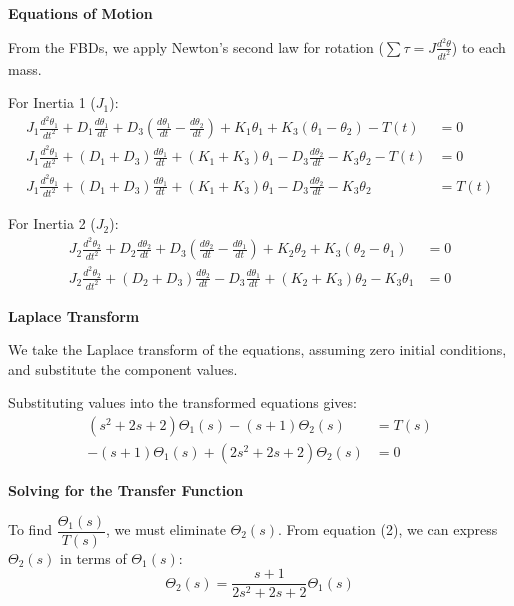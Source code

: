 \documentclass[11pt]{article}
\begin{document}
\noindent\textbf{Equations of Motion}
\vspace{5pt}

\noindent From the FBDs, we apply Newton's second law for rotation ($\sum \tau = J \frac{d^2\theta}{dt^2}$) to each mass.

\vspace{12pt}
{For Inertia 1 ($J_1$):}
\begin{align*}
J_1\frac{d^2\theta_1}{dt^2}
+ D_1\frac{d\theta_1}{dt}
+ D_3\!\left(\frac{d\theta_1}{dt}-\frac{d\theta_2}{dt}\right)
+ K_1\theta_1
+ K_3\!\left(\theta_1-\theta_2\right)
- T(t) &= 0 \\[4pt]
J_1\frac{d^2\theta_1}{dt^2}
+ (D_1 + D_3)\frac{d\theta_1}{dt}
+ (K_1 + K_3)\theta_1
- D_3\frac{d\theta_2}{dt}
- K_3\theta_2
- T(t) &= 0 \\[4pt]
J_1\frac{d^2\theta_1}{dt^2}
+ (D_1 + D_3)\frac{d\theta_1}{dt}
+ (K_1 + K_3)\theta_1
- D_3\frac{d\theta_2}{dt}
- K_3\theta_2
&= T(t)
\end{align*}

\newpage
{For Inertia 2 ($J_2$):}
\begin{align*}
J_2\frac{d^2\theta_2}{dt^2}
+ D_2\frac{d\theta_2}{dt}
+ D_3\!\left(\frac{d\theta_2}{dt}-\frac{d\theta_1}{dt}\right)
+ K_2\theta_2
+ K_3\!\left(\theta_2-\theta_1\right) &= 0 \\[4pt]
J_2\frac{d^2\theta_2}{dt^2}
+ (D_2 + D_3)\frac{d\theta_2}{dt}
- D_3\frac{d\theta_1}{dt}
+ (K_2 + K_3)\theta_2
- K_3\theta_1 &= 0
\end{align*}

\noindent\textbf{Laplace Transform}
\vspace{5pt}

\noindent We take the Laplace transform of the equations, assuming zero initial conditions, and substitute the component values.
\vspace{12pt}

{Substituting values into the transformed equations gives:}
\begin{align}
    (s^2 + 2s + 2)\Theta_1(s) - (s + 1)\Theta_2(s) &= T(s) \tag{1} \\
    -(s + 1)\Theta_1(s) + (2s^2 + 2s + 2)\Theta_2(s) &= 0 \tag{2}
\end{align}

\noindent\textbf{Solving for the Transfer Function}
\vspace{12pt}

\noindent To find $\dfrac{\Theta_1(s)}{T(s)}$, we must eliminate $\Theta_2(s)$. From equation (2), we can express $\Theta_2(s)$ in terms of $\Theta_1(s)$:
\[
\Theta_2(s) = \frac{s + 1}{2s^2 + 2s + 2} \Theta_1(s)
\]
\end{document}
